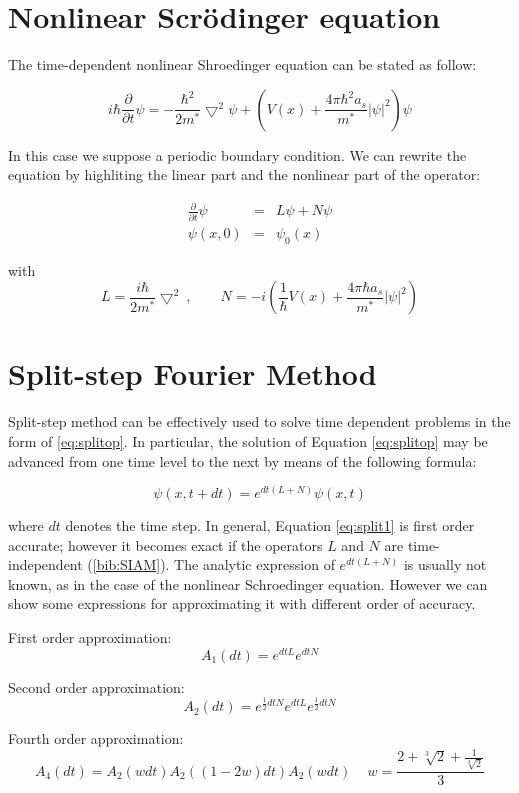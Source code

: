 \documentclass[a4paper,11pt]{article}
\begin{document}
\section{Nonlinear Scr\"{o}dinger equation}
The time-dependent nonlinear Shroedinger equation can be stated as follow:

$$ i \hbar \frac{\partial}{\partial t} \psi =
   -\frac{\hbar^2}{2m^*} \bigtriangledown^2 \psi +
   \left(V(x) + \frac{4 \pi \hbar^2 a_s}{m^*} |\psi|^2 \right) \psi $$

In this case we suppose a periodic boundary condition. We can rewrite the equation by highliting the linear part and the nonlinear part of the operator:

\begin{eqnarray}
\frac{\partial}{\partial t} \psi & = & L \psi + N \psi \label{eq:splitop} \\
\psi(x, 0) & = & \psi_0(x)
\end{eqnarray}

with
$$ L = \frac{i\hbar}{2m^*} \bigtriangledown^2 \ , \qquad
   N = -i \left(\frac{1}{\hbar}V(x) + \frac{4 \pi \hbar a_s}{m^*} |\psi|^2 \right) $$

\section{Split-step Fourier Method}
Split-step method can be effectively used to solve time dependent problems in the form of \ref{eq:splitop}.
In particular, the solution of Equation \ref{eq:splitop} may be advanced from one time level to the next by means of the following formula:

$$ \psi(x, t+dt) = e^{dt(L+N)} \psi(x, t) \label{eq:split1} $$

where $dt$ denotes the time step. In general, Equation \ref{eq:split1} is first order accurate; however it becomes exact if the operators $L$ and $N$ are time-independent (\ref{bib:SIAM}).
The analytic expression of $e^{dt(L+N)}$ is usually not known, as in the case of the nonlinear Schroedinger equation. However we can show some expressions for approximating it with different order of accuracy.

First order approximation:
$$ A_1(dt) = e^{dtL} e^{dtN} \label{eq:split2} $$

Second order approximation:
$$ A_2(dt) = e^{\frac{1}{2}dtN} e^{dtL} e^{\frac{1}{2}dtN} $$

Fourth order approximation:
$$ A_4(dt) = A_2(wdt) A_2((1-2w)dt) A_2(wdt) \, \quad
   w = \frac{2+\sqrt[3]{2} + \frac{1}{\sqrt[3]{2}}}{3} $$
\end{document}
